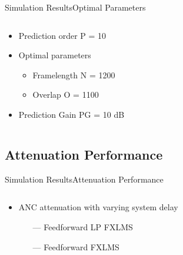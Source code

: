 \begin{frame}{Simulation Results}{Optimal Parameters}		
\begin{columns}
	\begin{column}{0.4\textwidth}
	\begin{itemize}
		\item Prediction order P = 10
		\item Optimal parameters
		\begin{itemize}
			\item Framelength N = 1200
			\item Overlap O = 1100
		\end{itemize}
		\item Prediction Gain PG = 10 dB
	\end{itemize}
	\end{column}
	\begin{column}{0.6\textwidth} 
		\resizebox{0.9\columnwidth}{!}{		
			}
	\end{column}
\end{columns}
\end{frame}






\subsection{Attenuation Performance}
\begin{frame}{Simulation Results}{Attenuation Performance}		
\begin{columns}
	\begin{column}{0.4\textwidth}
	\begin{itemize}
		\item ANC attenuation with varying system delay
		\begin{itemize}
				\item[\textcolor{MATLABorange}{---}] Feedforward LP FXLMS 
				\item[\textcolor{MATLABblue}{---}] Feedforward FXLMS 
		\end{itemize}
	\end{itemize}
	\end{column}
	\begin{column}{0.6\textwidth} 
		\resizebox{0.9\columnwidth}{!}{		
			}
	\end{column}
\end{columns}
\end{frame}






